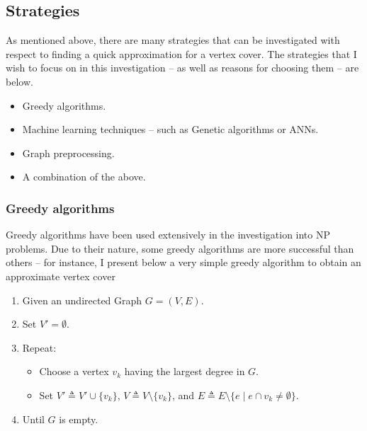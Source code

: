 \documentclass[11pt]{article}
\theoremstyle{definition}
\begin{document}
    \subsection{Strategies}  \label{sec:Strat} 
      As mentioned above, there are many strategies that can be investigated with respect to finding a quick approximation
      for a vertex cover.
      The strategies that I wish to focus on in this investigation -- as well as reasons for choosing them -- are below.
      \begin{itemize}
        \setlength{\itemsep}{1pt}
        \setlength{\parskip}{0pt}
        \setlength{\parsep}{0pt}
        \item Greedy algorithms.
        \item Machine learning techniques -- such as Genetic algorithms or ANNs.
        \item Graph preprocessing.
        \item A combination of the above.
      \end{itemize}
      
      \subsubsection{Greedy algorithms} \label{sec:greedy}
        Greedy algorithms have been used extensively in the investigation into NP problems. 
        Due to their nature, some greedy algorithms are more successful than others -- for instance,
        I present below a very simple greedy algorithm to obtain an approximate vertex cover \cite{paper:hybrid}
          \begin{enumerate} 
            \setlength{\itemsep}{1pt}
            \setlength{\parskip}{0pt}
            \setlength{\parsep}{0pt}
            \item Given an undirected Graph $G = (V,E)$.
            \item Set $V' = \emptyset$.
            \item Repeat:
              \begin{itemize}
                \setlength{\itemsep}{1pt}
                \setlength{\parskip}{0pt}
                \setlength{\parsep}{0pt}
                \item Choose a vertex $v_{k}$ having the largest degree in $G$.
                \item Set $V'\triangleq V' \cup \{v_{k}\} $, $V \triangleq  V \setminus \{ v_{k} \} $, and $ E \triangleq E \setminus \{e\mid e \cap v_{k} \neq \emptyset \}$.
              \end{itemize}
             \item Until $G$ is empty.
          \end{enumerate}
\end{document}
